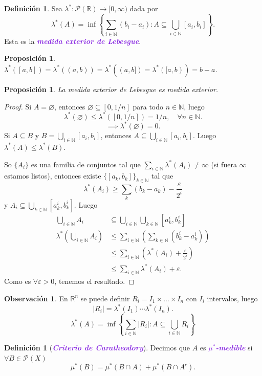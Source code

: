 \documentclass{article}
\newtheorem{proposition}[theorem]{Proposición}
\theoremstyle{definition}
\newtheorem{definition}[theorem]{Definición}
\newtheorem*{obs}{Observación}
\theoremstyle{remark}
\numberwithin{equation}{section}
\newcommand{\N}{\mathbb{N}}
\renewcommand{\P}{\mathcal{P}}
\newcommand{\R}{\mathbb{R}}
\newcommand{\e}{\varepsilon}
\newcommand{\lam}{\lambda}
\newcommand{\oo}{\infty}
\newcommand{\abs}[1]{\left| #1 \right|}
\newcommand{\br}[1]{\left( #1 \right)}
\newcommand{\set}[1]{\left\{ #1 \right\}}
\newcommand{\wea}[1]{\textcolor{BlueViolet}{\textbf{\emph{#1}}}}
\begin{document}
\begin{definition}
  Sea $\lam^* \colon \P(\R) \to [0,\oo)$ dada por
  \[\lam^*(A) = \inf\set{\sum_{i \in \N} (b_i-a_i) \colon A \subseteq \bigcup_{i \in \N} [a_i,b_i]}.\]
  Esta es la \wea{medida exterior de Lebesgue}.
\end{definition}

\begin{proposition}
  $\lam^*([a,b]) = \lam^*((a,b)) = \lam^*((a,b]) = \lam^*([a,b)) = b-a$.
\end{proposition}

\begin{proposition}
  La medida exterior de Lebesgue es medida exterior.
\end{proposition}
\begin{proof}
  Si $A = \varnothing$, entonces $\varnothing \subseteq [0,1/n]$ para todo $n \in \N$, luego
  \[\lam^*(\varnothing) \leq \lam^*([0,1/n]) = 1/n, \quad \forall n \in \N.\]
  \[\implies \lam^*(\varnothing) = 0.\]
  Si $A \subseteq B$ y $B = \bigcup_{i \in \N} [a_i,b_i]$, entonces $A \subseteq \bigcup_{i \in \N} [a_i,b_i]$. Luego $\lam^*(A) \leq \lam^*(B)$.

  So $\{A_i\}$ es una familia de conjuntos tal que $\sum_{i\in\N} \lam^*(A_i) \neq \oo$ (si fuera $\oo$ estamos listos), entonces existe $\{[a_k,b_k]\}_{k \in \N}$ tal que
  \[\lam^*(A_i) \geq \sum_k (b_k-a_k) - \frac{\e}{2^i}\]
  y $A_i \subseteq \bigcup_{k \in \N} [a_k^i, b_k^i]$.
  Luego
  \begin{align*}
    \bigcup_{i \in \N} A_i
    &\subseteq \bigcup_{i \in \N} \bigcup_{k \in \N} [a_k^i, b_k^i] \\
    \lam^*\br{\bigcup_{i \in \N} A_i}
    &\leq \sum_{i \in \N} \br{\sum_{k \in \N} (b_k^i - a_k^i)} \\
    &\leq \sum_{i \in \N} \br{\lam^*(A_i) + \frac{\e}{2^i}} \\
    &\leq \sum_{i\in\N} \lam^*(A_i) + \e.
  \end{align*}
  Como es $\forall \e>0$, tenemos el resultado.
\end{proof}

\begin{obs}
  En $\R^n$ se puede definir $R_i = I_1 \times \dots \times I_n$ con $I_i$ intervalos, luego
  \[\abs{R_i} = \lam^*(I_1) \cdots \lam^*(I_n).\]
  \[\lam^*(A) = \inf \set{
    \sum_{i\in\N} \abs{R_i} \colon A \subseteq \bigcup_{i \in \N} R_i
  }\]
\end{obs}

\begin{definition}
  [\wea{Criterio de Caratheodory}]
  Decimos que $A$ es \wea{$\mu^*$-medible} si $\forall B \in \P(X)$
  \[\mu^*(B) = \mu^*(B \cap A) + \mu^*(B \cap A^c).\]
\end{definition}
\end{document}
